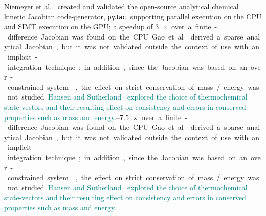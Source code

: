 \documentclass[12pt,number,sort&compress,preprint]{elsarticle}
\newcommand{\add}[1]{{\sloppy\textcolor{teal}{#1}}}  %
\begin{document}
Niemeyer et al.~\cite{Niemeyer:2016aa} created and validated the open-source analytical chemical kinetic Jacobian code-generator, \texttt{pyJac}, supporting parallel execution on the CPU and SIMT execution on the GPU; a speedup of \SIrange{3}{7.5}{$\times$} over a finite-difference Jacobian was found on the CPU.
Gao et al.~\cite{GAO2015287} derived a sparse analytical Jacobian, but it was not validated outside the context of use with an implicit-integration technique; in addition, since the Jacobian was based on an over-constrained system~\cite{HANSEN2018257}, the effect on strict conservation of mass\slash energy was not studied.
\add{Hansen and Sutherland~\cite{HANSEN2018257} explored the choice of thermochemical state-vectors and their resulting effect on consistency and errors in conserved properties such as mass and energy.}
\end{document}
